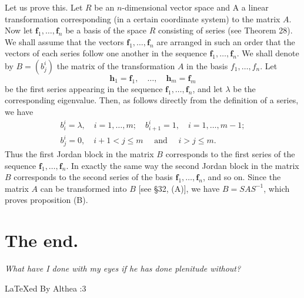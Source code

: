 \documentclass[10pt,a5paper]{book}
\makeatletter
\theoremstyle{plain}
\theoremstyle{definition}
\theoremstyle{remark}
\renewenvironment{proof}[1][\proofname]{\par
  \pushQED{\qed}%
  \normalfont\topsep6\p@\@plus6\p@\relax
  \trivlist
  \item\relax{\itshape #1\@addpunct{.}}\hspace\labelsep\ignorespaces
}{\popQED\endtrivlist\@endpefalse}
\makeatother
\begin{document}
\begin{proof}
Let us prove this. Let $R$ be an $n$-dimensional vector space and A a linear transformation corresponding (in a certain coordinate system) to the matrix $A$. Now let $\mathbf{f}_{1}, \ldots, \mathbf{f}_{n}$ be a basis of the space $R$ consisting of series (see Theorem 28). We shall assume that the vectors $\mathbf{f}_{1}, \ldots, \mathbf{f}_{n}$ are arranged in such an order that the vectors of each series follow one another in the sequence $\mathbf{f}_{1}, \ldots, \mathbf{f}_{n}$. We shall denote by $B=\left(b_{j}^{i}\right)$ the matrix of the transformation $A$ in the basis $f_{1}, \ldots, f_{n}$. Let
\[
\mathbf{h}_{1}=\mathbf{f}_{1}, \quad \ldots, \quad \mathbf{h}_{m}=\mathbf{f}_{m}
\]
be the first series appearing in the sequence $\mathbf{f}_{1}, \ldots, \mathbf{f}_{n}$, and let $\lambda$ be the corresponding eigenvalue. Then, as follows directly from the definition of a series, we have
\[
\begin{gathered}
b_{i}^{i}=\lambda, \quad i=1, \ldots, m ; \quad b_{i+1}^{i}=1, \quad i=1, \ldots, m-1 ; \\
b_{j}^{i}=0, \quad i+1<j \leq m \quad \text { and } \quad i>j \leq m .
\end{gathered}
\]
Thus the first Jordan block in the matrix $B$ corresponds to the first series of the sequence $\mathbf{f}_{1}, \ldots, \mathbf{f}_{n}$. In exactly the same way the second Jordan block in the matrix $B$ corresponds to the second series of the basis $\mathbf{f}_{1}, \ldots, \mathbf{f}_{n}$, and so on. Since the matrix $A$ can be transformed into $B$ [see §32, (A)], we have $B=S A S^{-1}$, which proves proposition (B).
\end{proof}

\chapter*{The end.}

\begin{center}
\vspace*{5em}
\textit{\large What have I done with my eyes if he has done plenitude without?} 
\vspace{11em}


LaTeXed By Althea :3

\end{center}
\end{document}
